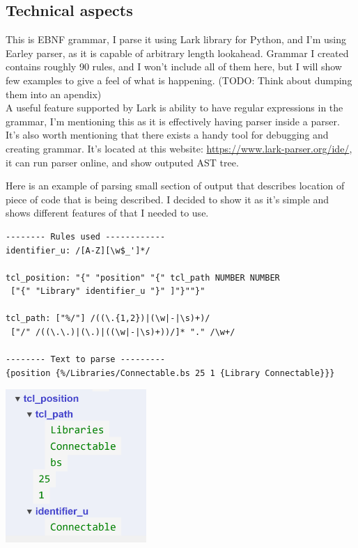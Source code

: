 \documentclass[14pt]{report}
\begin{document}
\subsection{Technical aspects}
This is EBNF grammar, I parse it using Lark library for Python, and I'm using Earley parser, as it is capable of arbitrary length lookahead. Grammar I created contains roughly 90 rules, and I won't include all of them here, but I will show few examples to give a feel of what is happening. (TODO: Think about dumping them into an apendix) 
\\
A useful feature supported by Lark is ability to have regular expressions in the grammar, I'm mentioning this as it is effectively having parser inside a parser. It's also worth mentioning that there exists a handy tool for debugging and creating grammar. It's located at this website: \href{https://www.lark-parser.org/ide/}{https://www.lark-parser.org/ide/}, it can run parser online, and show outputed AST tree.
\begin{tcolorbox}[title = Parsing position TODO maybe find a better example with shorter line]
    Here is an example of parsing small section of output that describes location of piece of code that is being described. I decided to show it as it's simple and shows different features of that I needed to use.
    \begin{verbatim}
-------- Rules used ------------
identifier_u: /[A-Z][\w$_']*/

tcl_position: "{" "position" "{" tcl_path NUMBER NUMBER 
 ["{" "Library" identifier_u "}" ]"}""}"

tcl_path: ["%/"] /((\.{1,2})|(\w|-|\s)+)/ 
 ["/" /((\.\.)|(\.)|((\w|-|\s)+))/]* "." /\w+/

-------- Text to parse ---------
{position {%/Libraries/Connectable.bs 25 1 {Library Connectable}}}
    \end{verbatim}
    \includegraphics[width=0.4\textwidth]{images/TCLPath.png}
\end{tcolorbox}
\end{document}
